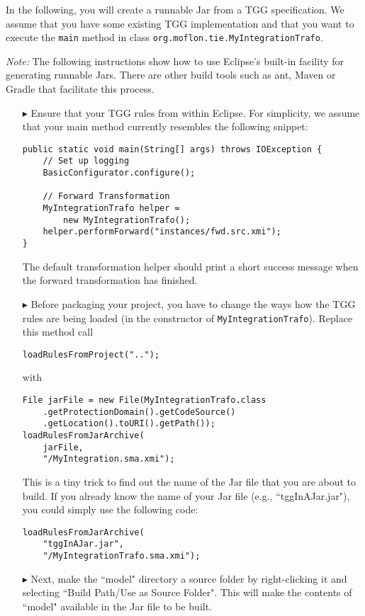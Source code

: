 In the following, you will create a runnable Jar from a TGG specification.
We assume that you have some existing TGG implementation and that you want to execute the \texttt{main} method in class \texttt{org.moflon.tie.MyIntegration\-Trafo}.

\emph{Note:}
The following instructions show how to use Eclipse's built-in facility for generating runnable Jars.
There are other build tools such as ant, Maven or Gradle that facilitate this process.

\begin{itemize}
    
\item[$\blacktriangleright$] 
Ensure that your TGG rules from within Eclipse.
For simplicity, we assume that your main method currently resembles the following snippet:
\begin{lstlisting}
public static void main(String[] args) throws IOException {
    // Set up logging
    BasicConfigurator.configure();

    // Forward Transformation
    MyIntegrationTrafo helper = 
        new MyIntegrationTrafo();
    helper.performForward("instances/fwd.src.xmi");
}
\end{lstlisting}
The default transformation helper should print a short success message when the forward transformation has finished.

\item[$\blacktriangleright$]
Before packaging your project, you have to change the ways how the TGG rules are being loaded (in the constructor of \texttt{MyIntegration\-Trafo}).
Replace this method call
\begin{lstlisting}
loadRulesFromProject("..");
\end{lstlisting}
with
\begin{lstlisting}
File jarFile = new File(MyIntegrationTrafo.class
    .getProtectionDomain().getCodeSource()
    .getLocation().toURI().getPath());
loadRulesFromJarArchive(
    jarFile,
    "/MyIntegration.sma.xmi");
\end{lstlisting}
This is a tiny trick to find out the name of the Jar file that you are about to build.
If you already know the name of your Jar file (e.g., ``tggInAJar.jar"), you could simply use the following code:
\begin{lstlisting}
loadRulesFromJarArchive(
    "tggInAJar.jar",
    "/MyIntegrationTrafo.sma.xmi");
\end{lstlisting}


\item[$\blacktriangleright$]
Next, make the ``model" directory a source folder by right-clicking it and selecting ``Build Path/Use as Source Folder".
This will make the contents of ``model" available in the Jar file to be built.



\end{itemize}
